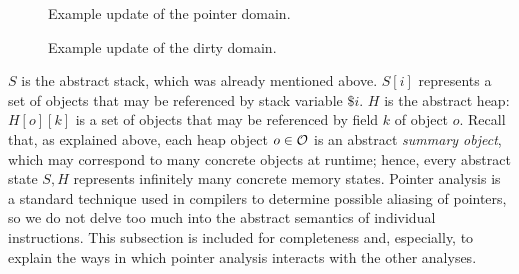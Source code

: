 \begin{figure}[t]
\begin{minipage}{0.45\textwidth}
%
\caption{Example update of the pointer domain.}
\label{fig:ptr-example}
\end{minipage}
\hspace{7mm}
%
\begin{minipage}{0.4\textwidth}
\centering
{}
\caption{Example update of the dirty domain.}
\label{fig:dirty-example}
\end{minipage}
\end{figure}


$S$ is the abstract stack, which was already mentioned above.
$S[i]$ represents a set of objects that may be referenced
by stack variable $\$i$.
$H$ is the abstract heap: $H[o][k]$ is a set of objects that
may be referenced by field $k$ of object $o$.
Recall that, as explained above, each heap object $o\in\mathcal{O}$
is an abstract \emph{summary object}, which may correspond
to many concrete objects at runtime;
hence, every abstract state $S,H$ represents infinitely
many concrete memory states.
Pointer analysis is a standard technique used in compilers
to determine possible aliasing of pointers, so we do not
delve too much into the abstract semantics of individual
instructions.
This subsection is included for completeness and, especially,
to explain the ways in which pointer analysis interacts with
the other analyses.


